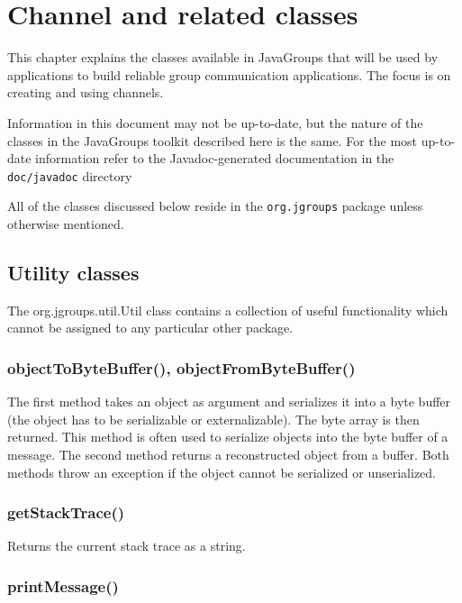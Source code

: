 
\chapter{Channel and related classes} \label{Channel}

This chapter explains the classes available in JavaGroups that will be used by
applications to build reliable group communication applications. The focus is on
creating and using channels.

Information in this document may not be up-to-date, but the nature of the classes in
the JavaGroups toolkit described here is the same. For the most up-to-date
information refer to the Javadoc-generated documentation in the {\tt
doc/javadoc} directory

All of the classes discussed below reside in the {\tt org.jgroups} package unless
otherwise mentioned.




  \section{Utility classes}

  The org.jgroups.util.Util class contains a collection of useful functionality
  which cannot be assigned to any particular other package.


    \subsection{objectToByteBuffer(), objectFromByteBuffer()} \label{ObjectToBB}

    The first method takes an object as argument and serializes it into a byte buffer
    (the object has to be serializable or externalizable). The byte array is then
    returned. This method is often used to serialize objects into the byte buffer of
    a message. The second method returns a reconstructed object from a buffer. Both
    methods throw an exception if the object cannot be serialized or unserialized.


    \subsection{getStackTrace()}

    Returns the current stack trace as a string.

    \subsection{printMessage()}
    
